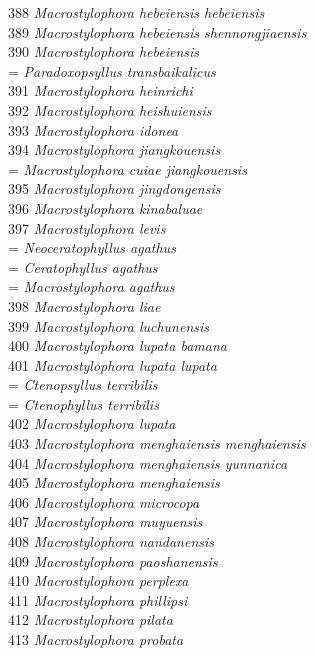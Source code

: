 \documentclass[
]{article}
\begin{document}
388 \emph{Macrostylophora hebeiensis hebeiensis}\\
389 \emph{Macrostylophora hebeiensis shennongjiaensis}\\
390 \emph{Macrostylophora hebeiensis}\\
= \emph{Paradoxopsyllus transbaikalicus}\\
391 \emph{Macrostylophora heinrichi}\\
392 \emph{Macrostylophora heishuiensis}\\
393 \emph{Macrostylophora idonea}\\
394 \emph{Macrostylophora jiangkouensis}\\
= \emph{Macrostylophora cuiae jiangkouensis}\\
395 \emph{Macrostylophora jingdongensis}\\
396 \emph{Macrostylophora kinabaluae}\\
397 \emph{Macrostylophora levis}\\
= \emph{Neoceratophyllus agathus}\\
= \emph{Ceratophyllus agathus}\\
= \emph{Macrostylophora agathus}\\
398 \emph{Macrostylophora liae}\\
399 \emph{Macrostylophora luchunensis}\\
400 \emph{Macrostylophora lupata bamana}\\
401 \emph{Macrostylophora lupata lupata}\\
= \emph{Ctenopsyllus terribilis}\\
= \emph{Ctenophyllus terribilis}\\
402 \emph{Macrostylophora lupata}\\
403 \emph{Macrostylophora menghaiensis menghaiensis}\\
404 \emph{Macrostylophora menghaiensis yunnanica}\\
405 \emph{Macrostylophora menghaiensis}\\
406 \emph{Macrostylophora microcopa}\\
407 \emph{Macrostylophora muyuensis}\\
408 \emph{Macrostylophora nandanensis}\\
409 \emph{Macrostylophora paoshanensis}\\
410 \emph{Macrostylophora perplexa}\\
411 \emph{Macrostylophora phillipsi}\\
412 \emph{Macrostylophora pilata}\\
413 \emph{Macrostylophora probata}\\
\end{document}
